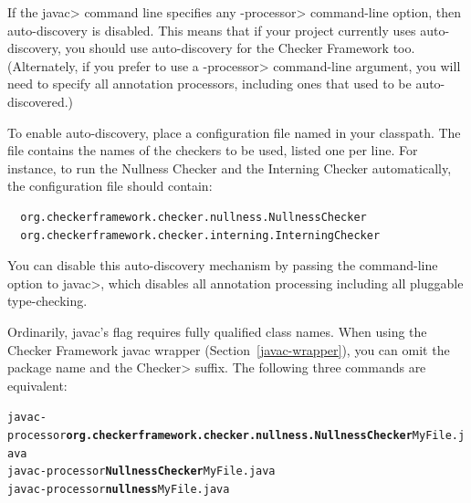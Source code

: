If the \<javac> command line specifies any \<-processor> command-line
option, then auto-discovery is disabled.  This means that if your project
currently uses auto-discovery, you should use auto-discovery for the
Checker Framework too.  (Alternately, if you prefer to use a \<-processor>
command-line argument, you will need to specify all annotation processors,
including ones that used to be auto-discovered.)

\begin{sloppypar}
To enable auto-discovery, place a configuration file named
in your classpath.  The file contains the names of the checkers to
be used, listed one per line.  For instance, to run the Nullness Checker and the
Interning Checker automatically, the configuration file should contain:
\end{sloppypar}

\begin{smaller}
\begin{Verbatim}
  org.checkerframework.checker.nullness.NullnessChecker
  org.checkerframework.checker.interning.InterningChecker
\end{Verbatim}
\end{smaller}

You can disable this auto-discovery mechanism by passing the
 command-line option to \<javac>, which disables all
annotation processing including all pluggable type-checking.





Ordinarily, javac's  flag requires fully qualified class names.
When using the Checker Framework javac wrapper (Section~\ref{javac-wrapper}), you can
omit the package name and the \<Checker> suffix.
The following three commands are equivalent:

\begin{alltt}
  javac -processor \textbf{org.checkerframework.checker.nullness.NullnessChecker} MyFile.java
  javac -processor \textbf{NullnessChecker} MyFile.java
  javac -processor \textbf{nullness} MyFile.java
\end{alltt}

